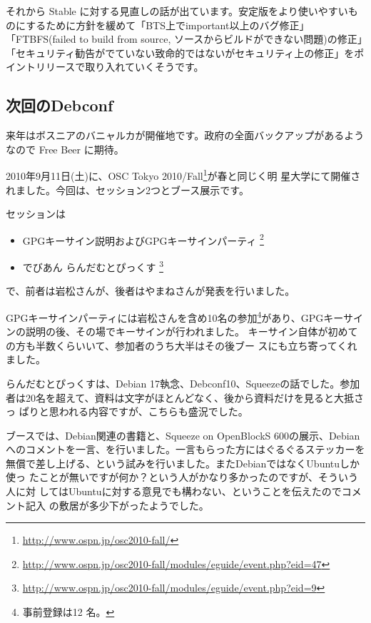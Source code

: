 \documentclass[mingoth,a4paper]{jsarticle}
\begin{document}
それから Stable に対する見直しの話が出ています。安定版をより使いやすいものにするために方針を緩めて「BTS上でimportant以上のバグ修正」「FTBFS(failed to build from source, ソースからビルドができない問題)の修正」「セキュリティ勧告がでていない致命的ではないがセキュリティ上の修正」をポイントリリースで取り入れていくそうです。

\subsection{次回のDebconf}
来年はボスニアのバニャルカが開催地です。政府の全面バックアップがあるようなので Free Beer に期待。


2010年9月11日(土)に、OSC Tokyo
2010/Fall\footnote{\url{http://www.ospn.jp/osc2010-fall/}}が春と同じく明
星大学にて開催されました。今回は、セッション2つとブース展示です。

セッションは
\begin{itemize}
 \item GPGキーサイン説明およびGPGキーサインパーティ
       \footnote{\url{http://www.ospn.jp/osc2010-fall/modules/eguide/event.php?eid=47}}
 \item でびあん らんだむとぴっくす
       \footnote{\url{http://www.ospn.jp/osc2010-fall/modules/eguide/event.php?eid=9}}
\end{itemize}
で、前者は岩松さんが、後者はやまねさんが発表を行いました。

GPGキーサインパーティには岩松さんを含め10名の参加\footnote{事前登録は12
名。}があり、GPGキーサインの説明の後、その場でキーサインが行われました。
キーサイン自体が初めての方も半数くらいいて、参加者のうち大半はその後ブー
スにも立ち寄ってくれました。

らんだむとぴっくすは、Debian 17執念、Debconf10、Squeezeの話でした。参加
者は20名を超えて、資料は文字がほとんどなく、後から資料だけを見ると大抵さっ
ぱりと思われる内容ですが、こちらも盛況でした。

ブースでは、Debian関連の書籍と、Squeeze on OpenBlockS 600の展示、Debian
へのコメントを一言、を行いました。一言もらった方にはぐるぐるステッカーを
無償で差し上げる、という試みを行いました。またDebianではなくUbuntuしか使っ
たことが無いですが何か？という人がかなり多かったのですが、そういう人に対
してはUbuntuに対する意見でも構わない、ということを伝えたのでコメント記入
の敷居が多少下がったようでした。
\end{document}
